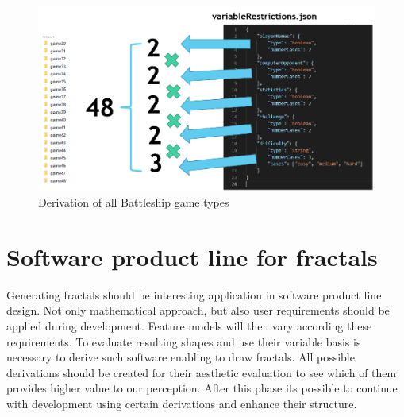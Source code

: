 \documentclass[11pt,slovak,a4paper,twoside]{article}
\begin{document}
\begin{figure}[!t]  %
					\begin{center}
									\includegraphics[width=\linewidth]{fig/allCases.png}
									\caption{Derivation of all Battleship game types}
									\label{derivationBattleshipTypes}
					\end{center}
\end{figure}


\section{Software product line for fractals} \label{fractalProductLine}

Generating fractals should be interesting application in software product line design. Not only mathematical approach, but also user requirements should be applied during development. Feature models will then vary according these requirements. To evaluate resulting shapes and use their variable basis is necessary to derive such software enabling to draw fractals. All possible derivations should be created for their aesthetic evaluation to see which of them provides higher value to our perception. After this phase its possible to continue with development using certain derivations and enhance their structure.
\end{document}
